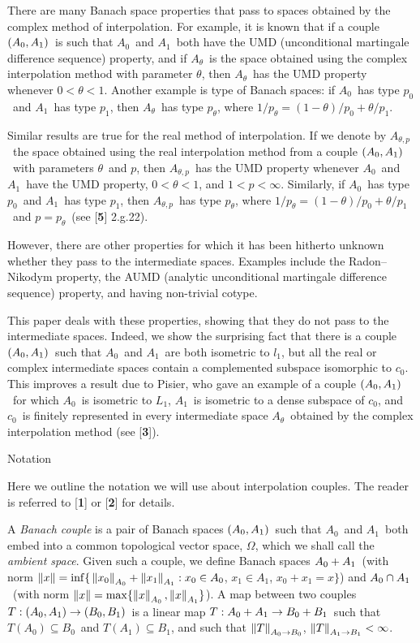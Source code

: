 
There are many Banach space properties that pass to spaces
obtained by the complex method of interpolation. For example, it is
known that if a couple $(A_0,A_1)$\ is such that $A_0$\ and $A_1$\ both have
the UMD (unconditional martingale difference sequence) property, and if
$A_\theta$\ is the space obtained using the complex
interpolation method with parameter $\theta$, then $A_\theta$\
has the UMD property whenever $0<\theta<1$. Another example is type of Banach
spaces: if $A_0$\ has type $p_0$\ and $A_1$\ has type $p_1$, then $A_\theta$\
has type $p_\theta$, where $1/p_\theta =
(1-\theta)/p_0 + \theta/p_1$.

Similar results are true for the real method of interpolation. If we denote by
$A_{\theta,p}$\ the space obtained using the real interpolation method from a
couple $(A_0,A_1)$\ with parameters $\theta$\ and $p$, then $A_{\theta,p}$\ has
the UMD property whenever $A_0$\ and $A_1$\ have the UMD property, $0<\theta<1$,
and $1<p<\infty$. Similarly, if $A_0$\ has type $p_0$\ and $A_1$\ has type
$p_1$, then $A_{\theta,p}$\ has type $p_\theta$, where $1/p_\theta =
(1-\theta)/p_0 + \theta/p_1$\ and $p=p_\theta$\ (see [{\bf 5}] 2.g.22).

However, there are other properties for which it has been hitherto unknown
whether they pass to the intermediate spaces. Examples include the
Radon--Nikodym property, the AUMD (analytic unconditional martingale difference
sequence) property, and having non-trivial cotype. 

This paper deals with these properties, showing that they do not pass to the
intermediate spaces. Indeed, we show the surprising fact that there is a couple
$(A_0,A_1)$\ such that $A_0$\ and $A_1$\ are both isometric to $l_1$, but all
the real or complex intermediate spaces contain a complemented subspace
isomorphic to $c_0$. This improves a result due to Pisier, who gave an example
of a couple $(A_0,A_1)$\ for which $A_0$\ is isometric to $L_1$, $A_1$\ is
isometric to a dense subspace of $c_0$, and $c_0$\ is finitely represented in
every intermediate space $A_\theta$\ obtained by the complex interpolation
method (see [{\bf 3}]).

\beginsection Notation

Here we outline the notation we will use about interpolation couples. The reader
is referred to [{\bf 1}] or [{\bf 2}] for details.

A {\it Banach couple\/} is a pair of Banach spaces $(A_0,A_1)$\ such that
$A_0$\ and $A_1$\ both embed into a common topological vector space, $\Omega$,
which we shall call the {\it ambient space}. Given such a couple, we define
Banach spaces $A_0 + A_1$\ (with norm $\left\| x \right\| = \inf \{\,\left\| x_0 \right\|_{A_0} +
\left\| x_1 \right\|_{A_1} : x_0 \in A_0$, $x_1\in A_1$, $x_0+x_1 = x \}$) and $A_0 \cap A_1$\
(with norm $\left\| x \right\| = \max\{\left\| x \right\|_{A_0},\left\| x \right\|_{A_1} \}$). A map between
two couples $T:(A_0,A_1) \to (B_0,B_1)$\ is a linear map $T:A_0 + A_1 \to B_0 + B_1$\
such that $T(A_0) \subseteq B_0$\ and $T(A_1) \subseteq B_1$, and such that
$\left\| T \right\|_{A_0 \to B_0}$, $\left\| T \right\|_{A_1\to B_1} < \infty$.

